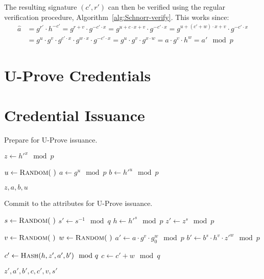 The resulting signature $(c', r')$ can then be verified using the regular
verification procedure, Algorithm~\ref{alg:Schnorr-verify}. This works since:
\begin{align*}
  \hat{a}
  & = g^{r'} \cdot h^{-c'}
  = g^{r + v} \cdot g^{-c' \cdot x}
  = g^{u + c \cdot x + v} \cdot g^{-c' \cdot x}
  = g^{u + (c' + w) \cdot x + v} \cdot g^{-c' \cdot x} \\
  & = g^u \cdot g^v \cdot g^{c' \cdot x} \cdot g^{w \cdot x} \cdot g^{-c' \cdot x}
  = g^u \cdot g^v \cdot g^{x \cdot w}
  = a \cdot g^v \cdot h^w
  = a' \mod p
\end{align*}

\section{U-Prove Credentials}

\section{Credential Issuance}

\begin{algorithm}
  \caption{Prepare for U-Prove issuance.}
  \label{alg:UP-issuance-prepare}
  \addtolength{\baselineskip}{1mm}
  \begin{algorithmic}[1]
      \State $z \gets h'^x \mod p$

      \State $u \gets \Call{Random}{~}$
      \State $a \gets g^u \mod p$
      \State $b \gets h'^u \mod p$

      \Return $z, a, b, u$
    \EndFunction
  \end{algorithmic}
\end{algorithm}

\begin{algorithm}
  \caption{Commit to the attributes for U-Prove issuance.}
  \label{alg:UP-issuance-commit}
  \addtolength{\baselineskip}{1mm}
  \begin{algorithmic}[1]
      \State $s \gets \Call{Random}{~}$
      \State $s' \gets s^{-1} \mod q$
      \State $h \gets h'^s \mod p$
      \State $z' \gets z^s \mod p$

      \State $v \gets \Call{Random}{~}$
      \State $w \gets \Call{Random}{~}$
      \State $a' \gets a \cdot g^v \cdot g_0^w \mod p$
      \State $b' \gets b^s \cdot h^v \cdot z'^w \mod p$

      \State $c' \gets \Call{Hash}{h, z', a', b'} \mod q$
      \State $c \gets c' + w \mod q$

      \Return $z', a', b', c, c', v, s'$
    \EndFunction
  \end{algorithmic}
\end{algorithm}

